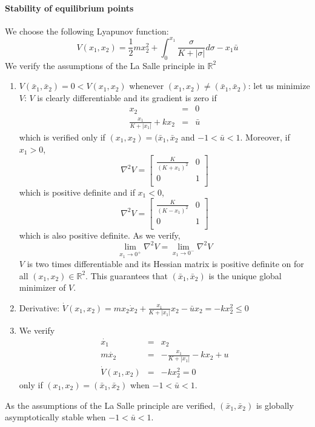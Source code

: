\paragraph{Stability of equilibrium points}
We choose the following Lyapunov function:
$$V(x_1,x_2)=\frac{1}{2}mx_2^2+\int_0^{x_1}\frac{\sigma}{K+|\sigma|}d\sigma-x_1\bar{u}$$
We verify the assumptions of the La Salle principle in $\mathbb{R}^2$
\begin{enumerate}
\item $V(\bar{x}_1,\bar{x}_2)=0<V(x_1,x_2)$ whenever $(x_1,x_2)\neq (\bar{x}_1,\bar{x}_2)$: let us minimize $V$: $V$ is clearly differentiable and its gradient is zero if
$$
\begin{array}{rcl}
x_2 &=& 0\\
\frac{x_1}{K+|x_1|}+kx_2 &=& \bar{u}
\end{array}
$$
which is verified only if $(x_1,x_2)=(\bar{x}_1,\bar{x}_2$ and $-1<\bar{u}<1$.
Moreover, if $x_1>0$,
$$
\nabla^2V=\begin{bmatrix}
\frac{K}{(K+x_1)^2} & 0\\
0 & 1\\
\end{bmatrix}
$$
which is positive definite and if $x_1<0$,
$$
\nabla^2V=\begin{bmatrix}
\frac{K}{(K-x_1)^2} & 0\\
0 & 1\\
\end{bmatrix}
$$
which is also positive definite. As we verify,
$$
\lim_{x_1\rightarrow 0^+}\nabla^2V=\lim_{x_1\rightarrow 0^-}\nabla^2V
$$
$V$ is two times differentiable and its Hessian matrix is positive definite on for all $(x_1,x_2)\in\mathbb{R}^2$. This guarantees that $(\bar{x}_1,\bar{x}_2)$ is the unique global minimizer of $V$.
\item Derivative:
$\dot{V}(x_1,x_2)=mx_2\dot{x}_2+\frac{x_1}{K+|x_1|}x_2-\bar{u}x_2=-kx_2^2\leq 0$
\item We verify 
$$
\begin{array}{rcl}
\dot{x_1} &=& x_2\\
m\dot{x_2} &=& -\frac{x_1}{K+|x_1|}-kx_2+u\\
\dot{V}(x_1,x_2) &=& -kx_2^2=0
\end{array}
$$
only if $(x_1,x_2)=(\bar{x}_1,\bar{x}_2)$ when $-1<\bar{u}<1$.
\end{enumerate}

As the assumptions of the La Salle principle are verified, $(\bar{x}_1,\bar{x}_2)$ is globally asymptotically stable when $-1<\bar{u}<1$.

